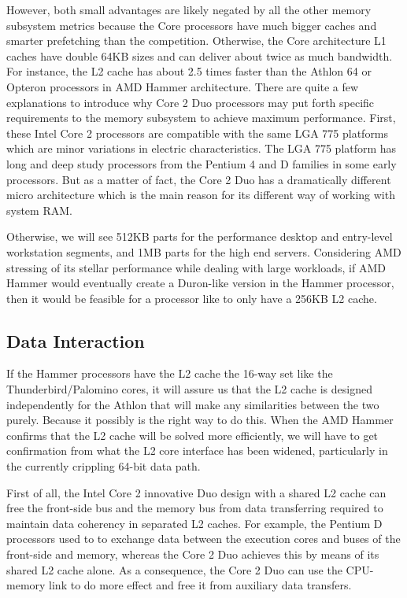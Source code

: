 \documentclass[letterpaper,10pt,compsoc,draftclsnofoot,onecolumn]{IEEEtran}
\begin{document}
However, both small advantages are likely negated by all the other memory subsystem metrics because the Core processors have much bigger caches and smarter prefetching than the competition. Otherwise, the Core architecture L1 caches have double 64KB sizes and can deliver about twice as much bandwidth. For instance, the L2 cache has about 2.5 times faster than the Athlon 64 or Opteron processors in AMD Hammer architecture. There are quite a few explanations to introduce why Core 2 Duo processors may put forth specific requirements to the memory subsystem to achieve maximum performance. First, these Intel Core 2 processors are compatible with the same LGA 775 platforms which are minor variations in electric characteristics. The LGA 775 platform has long and deep study processors from the Pentium 4 and D families in some early processors. But as a matter of fact, the Core 2 Duo has a dramatically different micro architecture which is the main reason for its different way of working with system RAM\cite{pdf_intel_duo}.

Otherwise, we will see 512KB parts for the performance desktop and entry-level workstation segments, and 1MB parts for the high end servers. Considering AMD stressing of its stellar performance while dealing with large workloads, if AMD Hammer would eventually create a Duron-like version in the Hammer processor, then it would be feasible for a processor like to only have a 256KB L2 cache.

\subsection{Data Interaction}
If the Hammer processors have the L2 cache the 16-way set like the Thunderbird/Palomino cores, it will assure us that the L2 cache is designed independently for the Athlon that will make any similarities between the two purely. Because it possibly is the right way to do this. When the AMD Hammer confirms that the L2 cache will  be solved more efficiently, we will have to get confirmation from what the L2 core interface has been widened\cite{pdf_intel_duo}, particularly in the currently crippling 64-bit data path.

First of all, the Intel Core 2 innovative Duo design with a shared L2 cache can free the front-side bus and the memory bus from data transferring required to maintain data coherency in separated L2 caches. For example, the Pentium D  processors used to to exchange data between the execution cores and buses of the front-side and memory, whereas the Core 2 Duo achieves this by means of its shared L2 cache alone\cite{pdf_intel_core}. As a consequence, the Core 2 Duo can use the CPU-memory link to do more effect and free it from auxiliary data transfers.
\end{document}
